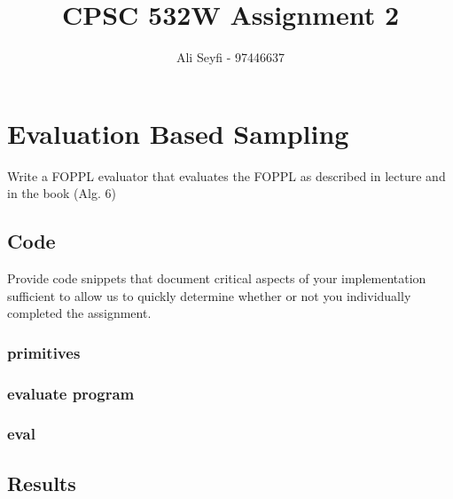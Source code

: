 \documentclass{article}
\def\blu#1{{\color{blu}#1}}
\begin{document}
\title{\vspace{-20mm}
CPSC 532W Assignment 2}
\author{Ali Seyfi - 97446637}
\date{}
\maketitle

\section{Evaluation Based Sampling}

\blu{Write a FOPPL evaluator that evaluates the FOPPL as described in lecture and in the book (Alg. 6)}

\subsection{Code}
\blu{Provide code snippets that document critical aspects of your implementation sufficient to allow us to quickly determine whether or not you individually completed the assignment.}
\subsubsection{primitives}
\label{primitives}

\pagebreak

\pagebreak


\pagebreak
\subsubsection{evaluate program}

\subsubsection{eval}

\subsection{Results}
\end{document}
